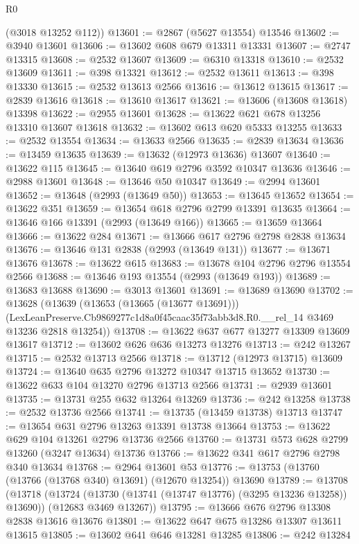 \begin{lexlean}{R0}
\begin{coremodule}
      (@3018 @13252 @112))
@13601 := @2867 (@5627 @13554) @13546
@13602 := @3940 @13601
@13606 := @13602 @608 @679 @13311 @13331
@13607 := @2747 @13315
@13608 := @2532 @13607
@13609 := @6310 @13318
@13610 := @2532 @13609
@13611 := @398 @13321
@13612 := @2532 @13611
@13613 := @398 @13330
@13615 := @2532 @13613 @2566
@13616 := @13612 @13615
@13617 := @2839 @13616
@13618 := @13610 @13617
@13621 := @13606 (@13608 @13618) @13398
@13622 := @2955 @13601
@13628 := @13622 @621 @678 @13256 @13310 @13607 @13618
@13632 := @13602 @613 @620 @5333 @13255
@13633 := @2532 @13554
@13634 := @13633 @2566
@13635 := @2839 @13634
@13636 := @13459 @13635
@13639 := @13632 (@12973 @13636) @13607
@13640 := @13622 @115
@13645 := @13640 @619 @2796 @3592 @10347 @13636
@13646 := @2988 @13601
@13648 := @13646 @50 @10347
@13649 := @2994 @13601
@13652 := @13648 (@2993 (@13649 @50))
@13653 := @13645 @13652
@13654 := @13622 @351
@13659 := @13654 @618 @2796 @2799 @13391 @13635
@13664 := @13646 @166 @13391 (@2993 (@13649 @166))
@13665 := @13659 @13664
@13666 := @13622 @284
@13671 := @13666 @617 @2796 @2798 @2838 @13634
@13676 := @13646 @131 @2838 (@2993 (@13649 @131))
@13677 := @13671 @13676
@13678 := @13622 @615
@13683 := @13678 @104 @2796 @2796 @13554 @2566
@13688 := @13646 @193 @13554 (@2993 (@13649 @193))
@13689 := @13683 @13688
@13690 := @3013 @13601
@13691 := @13689 @13690
@13702 := @13628
    (@13639
      (@13653 (@13665 (@13677 @13691)))
      (LexLeanPreserve.Cb9869277c1d8a0f45caac35f73abb3d8.R0.__rel_14 @3469 @13236 @2818 @13254))
@13708 := @13622 @637 @677 @13277 @13309 @13609 @13617
@13712 := @13602 @626 @636 @13273 @13276
@13713 := @242 @13267
@13715 := @2532 @13713 @2566
@13718 := @13712 (@12973 @13715) @13609
@13724 := @13640 @635 @2796 @13272 @10347 @13715 @13652
@13730 := @13622 @633 @104 @13270 @2796 @13713 @2566
@13731 := @2939 @13601
@13735 := @13731 @255 @632 @13264 @13269
@13736 := @242 @13258
@13738 := @2532 @13736 @2566
@13741 := @13735 (@13459 @13738) @13713
@13747 := @13654 @631 @2796 @13263 @13391 @13738 @13664
@13753 := @13622 @629 @104 @13261 @2796 @13736 @2566
@13760 := @13731 @573 @628 @2799 @13260 (@3247 @13634) @13736
@13766 := @13622 @341 @617 @2796 @2798 @340 @13634
@13768 := @2964 @13601 @53
@13776 := @13753 (@13760 (@13766 (@13768 @340) @13691) (@12670 @13254)) @13690
@13789 := @13708
    (@13718
      (@13724 (@13730 (@13741 (@13747 @13776) (@3295 @13236 @13258)) @13690))
      (@12683 @3469 @13267))
@13795 := @13666 @676 @2796 @13308 @2838 @13616 @13676
@13801 := @13622 @647 @675 @13286 @13307 @13611 @13615
@13805 := @13602 @641 @646 @13281 @13285
@13806 := @242 @13284

\end{coremodule}
\end{lexlean}
